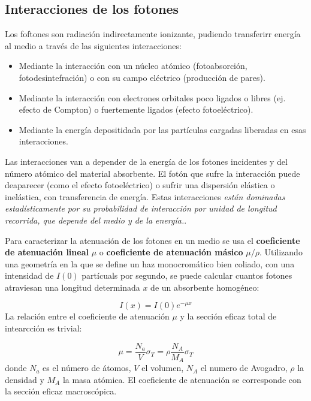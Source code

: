      
\subsection{Interacciones de los fotones}

Los foftones son radiación indirectamente ionizante, pudiendo transferirr energía al medio a través de las siguientes interacciones: 

\begin{itemize}
    \item Mediante la interacción con un núcleo atómico (fotoabsorción, fotodesintefración) o con su campo eléctrico (producción de pares).
    \item Mediante la interacción con electrones orbitales poco ligados o libres (ej. efecto de Compton) o fuertemente ligados (efecto fotoeléctrico).
    \item Mediante la energía depositidada por las partículas cargadas liberadas en esas interacciones. 
\end{itemize}
Las interacciones van a depender de la energía de los fotones incidentes y del número atómico del material absorbente. El fotón que sufre la interacción puede deaparecer (como el efecto fotoeléctrico) o sufrir una dispersión elástica o inelástica, con transferencia de energía. Estas interacciones \textit{están dominadas estadísticamente por su probabilidad de interacción por unidad de longitud recorrida, que depende del medio y de la energía.}.

Para caracterizar la atenuación de los fotones en un medio se usa el \textbf{coeficiente de atenuación lineal} $\mu$ o \textbf{coeficiente de atenuación másico} $\mu/\rho$.  Utilizando una geometría en la que se define un haz monocromático bien coliado, con una intensidad de $I(0)$  partícuals por segundo, se puede calcular cuantos fotones atraviesan una longitud determinada $x$ de un absorbente homogéneo: 

\begin{equation}
    I (x) = I (0) e^{-\mu x}
\end{equation}
La relación entre el coeficiente de atenuación $\mu$ y la sección eficaz total de intearcción es trivial: 

\begin{equation}
    \mu = \frac{N_a}{V} \sigma_T = \rho \frac{N_A}{M_A} \sigma_T
\end{equation}
donde $N_a$ es el número de átomos, $V$ el volumen, $N_A$ el numero de Avogadro, $\rho$ la densidad y $M_A$ la masa atómica. El coeficiente de atenuación se corresponde con la sección eficaz macroscópica. 


